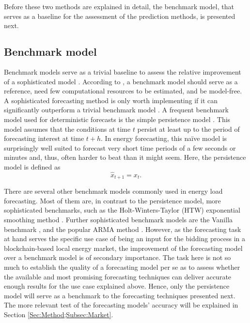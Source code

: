 Before these two methods are explained in detail, the benchmark model, that serves as a baseline for the assessment of the prediction methods, is presented next.



\subsection{Benchmark model} \label{Sec:Method;Subsec:Benchmark}

Benchmark models serve as a trivial baseline to assess the relative improvement of a sophisticated model \citep{Meer:2018}. According to \citet{Pinson:2012}, a benchmark model should serve as a reference, need few computational resources to be estimated, and be model-free. A sophisticated forecasting method is only worth implementing if it can significantly outperform a trivial benchmark model \citep{Diagne:2013}. A frequent benchmark model used for deterministic forecasts is the simple persistence model \citep{Meer:2018}. This model assumes that the conditions at time $t$ persist at least up to the period of forecasting interest at time $t+h$. In energy forecasting, this na\"ive model is surprisingly well suited to forecast very short time periods of a few seconds or minutes \citep{Pinson:2012} and, thus, often harder to beat than it might seem. Here, the persistence model is defined as
%
\begin{equation} \label{Eq:naivepred}
\widehat{x}_{t+1}=x_t.
\end{equation}

There are several other benchmark models commonly used in energy load forecasting. Most of them are, in contrast to the persistence model, more sophisticated benchmarks, such as the Holt-Winters-Taylor (HTW) exponential smoothing method \citep[see, e.g.,][]{Arora:2016}. Further sophisticated benchmark models are the Vanilla benchmark \citep{hong:2010}, and the popular ARMA method \citep{Box:1990}. However, as the forecasting task at hand serves the specific use case of being an input for the bidding process in a blockchain-based local energy market, the improvement of the forecasting model over a benchmark model is of secondary importance. The task here is not so much to establish the quality of a forecasting model per se as to assess whether the available and most promising forecasting techniques can deliver accurate enough results for the use case explained above. Hence, only the persistence model will serve as a benchmark to the forecasting techniques presented next. The more relevant test of the forecasting models' accuracy will be explained in Section \ref{Sec:Method;Subsec:Market}.



